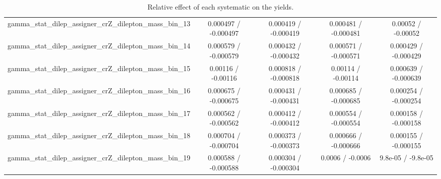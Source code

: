 \documentclass[10pt]{article}
\begin{document}
\begin{table}[htbp]
\begin{center}
\begin{tabular}{|c|c|c|c|c|}
  gamma_stat_dilep_assigner_crZ_dilepton_mass_bin_13 & 0.000497 / -0.000497 & 0.000419 / -0.000419 & 0.000481 / -0.000481 & 0.00052 / -0.00052 \\ 
  gamma_stat_dilep_assigner_crZ_dilepton_mass_bin_14 & 0.000579 / -0.000579 & 0.000432 / -0.000432 & 0.000571 / -0.000571 & 0.000429 / -0.000429 \\ 
  gamma_stat_dilep_assigner_crZ_dilepton_mass_bin_15 & 0.00116 / -0.00116 & 0.000818 / -0.000818 & 0.00114 / -0.00114 & 0.000639 / -0.000639 \\ 
  gamma_stat_dilep_assigner_crZ_dilepton_mass_bin_16 & 0.000675 / -0.000675 & 0.000431 / -0.000431 & 0.000685 / -0.000685 & 0.000254 / -0.000254 \\ 
  gamma_stat_dilep_assigner_crZ_dilepton_mass_bin_17 & 0.000562 / -0.000562 & 0.000412 / -0.000412 & 0.000554 / -0.000554 & 0.000158 / -0.000158 \\ 
  gamma_stat_dilep_assigner_crZ_dilepton_mass_bin_18 & 0.000704 / -0.000704 & 0.000373 / -0.000373 & 0.000666 / -0.000666 & 0.000155 / -0.000155 \\ 
  gamma_stat_dilep_assigner_crZ_dilepton_mass_bin_19 & 0.000588 / -0.000588 & 0.000304 / -0.000304 & 0.0006 / -0.0006 & 9.8e-05 / -9.8e-05 \\ 
\hline 
\end{tabular} 
\caption{Relative effect of each systematic on the yields.} 
\end{center} 
\end{table} 
\end{document}
